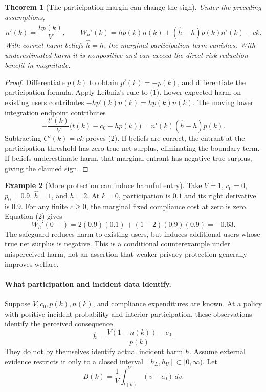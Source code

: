 \documentclass[11pt]{article}
\newtheorem{theorem}{Theorem}
\theoremstyle{definition}
\newtheorem{example}[theorem]{Example}
\begin{document}
\begin{theorem}[The participation margin can change the sign]
Under the preceding assumptions,
\[
 n'(k)=\frac{\widehat h p(k)}V,
\qquad
 W_h'(k)=h p(k)n(k)
       +(\widehat h-h)p(k)n'(k)-ck.
 \tag{2}
\]
With correct harm beliefs $\widehat h=h$, the marginal participation term vanishes. With underestimated harm it is nonpositive and can exceed the direct risk-reduction benefit in magnitude.
\end{theorem}
\begin{proof}
Differentiate $p(k)$ to obtain $p'(k)=-p(k)$, and differentiate the participation formula. Apply Leibniz's rule to (1). Lower expected harm on existing users contributes $-hp'(k)n(k)=hp(k)n(k)$. The moving lower integration endpoint contributes
\[
 -\frac{t'(k)}V\bigl(t(k)-c_0-hp(k)\bigr)
 =n'(k)(\widehat h-h)p(k).
\]
Subtracting $C'(k)=ck$ proves (2). If beliefs are correct, the entrant at the participation threshold has zero true net surplus, eliminating the boundary term. If beliefs underestimate harm, that marginal entrant has negative true surplus, giving the claimed sign.
\end{proof}

\begin{example}[More protection can induce harmful entry]
Take $V=1$, $c_0=0$, $p_0=0.9$, $\widehat h=1$, and $h=2$. At $k=0$, participation is $0.1$ and its right derivative is $0.9$. For any finite $c\geq0$, the marginal fixed compliance cost at zero is zero. Equation (2) gives
\[
 W_h'(0+)=2(0.9)(0.1)+(1-2)(0.9)(0.9)=-0.63.
\]
The safeguard reduces harm to existing users, but induces additional users whose true net surplus is negative. This is a conditional counterexample under misperceived harm, not an assertion that weaker privacy protection generally improves welfare.
\end{example}

\paragraph{What participation and incident data identify.}
Suppose $V,c_0,p(k),n(k)$, and compliance expenditures are known. At a policy with positive incident probability and interior participation, these observations identify the perceived consequence
\[
 \widehat h=\frac{V(1-n(k))-c_0}{p(k)}.
\]
They do not by themselves identify actual incident harm $h$. Assume external evidence restricts it only to a closed interval $[h_L,h_U]\subset[0,\infty)$. Let
\[
 B(k)=\frac1V\int_{t(k)}^V(v-c_0)\,dv.
\]
\end{document}
